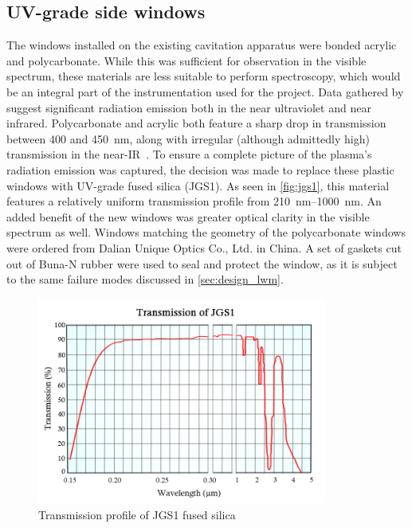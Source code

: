         \subsection{UV-grade side windows}
            The windows installed on the existing cavitation apparatus were bonded acrylic and polycarbonate. While this was sufficient for observation in the visible spectrum, these materials are less suitable to perform spectroscopy, which would be an integral part of the instrumentation used for the project. Data gathered by \textcite{zimakovInteractionNearIRLaser2016,luCharacteristicDiagnosticsLaserStabilized2022} suggest significant radiation emission both in the near ultraviolet and near infrared. Polycarbonate and acrylic both feature a sharp drop in transmission between 400 and 450~\unit{nm}, along with irregular (although admittedly high) transmission in the near-IR~\cite{gsplasticopticsTransmissionCurvesOptics}. To ensure a complete picture of the plasma's radiation emission was captured, the decision was made to replace these plastic windows with UV-grade fused silica (JGS1). As seen in \autoref{fig:jgs1}, this material features a relatively uniform transmission profile from \qtyrange{210}{1000}{nm}. An added benefit of the new windows was greater optical clarity in the visible spectrum as well. Windows matching the geometry of the polycarbonate windows were ordered from Dalian Unique Optics Co., Ltd. in China. A set of gaskets cut out of Buna-N rubber were used to seal and protect the window, as it is subject to the same failure modes discussed in \autoref{sec:design_lwm}.

            \begin{figure}[h]
                \centering
                \includegraphics[width=0.85\textwidth, clip, trim=0 0 0 15pt]{assets/3 design/jgs1_transmission.jpg}
                \caption[Transmission profile of JGS1 fused silica]{Transmission profile of JGS1 fused silica~\cite{shalomeoJGS1}}
                \label{fig:jgs1}
            \end{figure}

